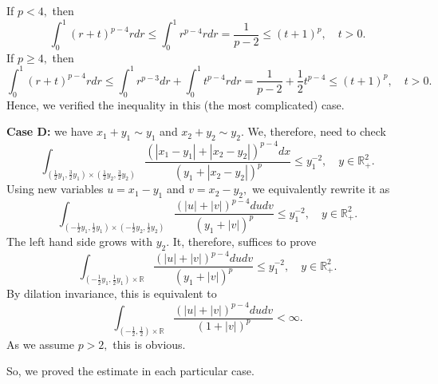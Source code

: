 \documentclass{amsart}
\begin{document}
If $p<4,$ then
$$\int_0^1(r+t)^{p-4}rdr\leq \int_0^1r^{p-4}rdr=\frac1{p-2}\leq (t+1)^p,\quad t>0.$$
If $p\geq 4,$ then
$$\int_0^1(r+t)^{p-4}rdr\leq \int_0^1r^{p-3}dr+\int_0^1t^{p-4}rdr=\frac1{p-2}+\frac12t^{p-4}\leq (t+1)^p,\quad t>0.$$
Hence, we verified the inequality in this (the most complicated) case.

{\bf Case D:} we have $x_1+y_1\sim y_1$ and $x_2+y_2\sim y_2.$ We, therefore, need to check 
$$\int_{(\frac12y_1,\frac32y_1)\times(\frac12y_2,\frac32y_2)}\frac{(|x_1-y_1|+|x_2-y_2|)^{p-4}dx}{(y_1+|x_2-y_2|)^p}\leq y_1^{-2},\quad y\in\mathbb{R}^2_+.$$
Using new variables $u=x_1-y_1$ and $v=x_2-y_2,$ we equivalently rewrite it as
$$\int_{(-\frac12y_1,\frac12y_1)\times(-\frac12y_2,\frac12y_2)}\frac{(|u|+|v|)^{p-4}dudv}{(y_1+|v|)^p}\leq y_1^{-2},\quad y\in\mathbb{R}^2_+.$$
The left hand side grows with $y_2.$ It, therefore, suffices to prove
$$\int_{(-\frac12y_1,\frac12y_1)\times\mathbb{R}}\frac{(|u|+|v|)^{p-4}dudv}{(y_1+|v|)^p}\leq y_1^{-2},\quad y\in\mathbb{R}^2_+.$$
By dilation invariance, this is equivalent to
$$\int_{(-\frac12,\frac12)\times\mathbb{R}}\frac{(|u|+|v|)^{p-4}dudv}{(1+|v|)^p}<\infty.$$
As we assume $p>2,$ this is obvious.



So, we proved the estimate in each particular case.
\end{document}
